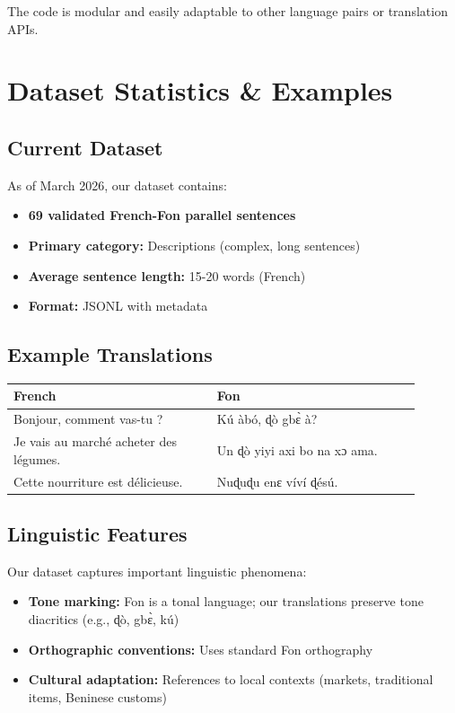 \documentclass[10pt,twocolumn]{article}
\begin{document}
The code is modular and easily adaptable to other language pairs or translation APIs.

\section{Dataset Statistics \& Examples}

\subsection{Current Dataset}

As of March 2026, our dataset contains:
\begin{itemize}[leftmargin=*,noitemsep,topsep=0pt]
    \item \textbf{69 validated French-Fon parallel sentences}
    \item \textbf{Primary category:} Descriptions (complex, long sentences)
    \item \textbf{Average sentence length:} 15-20 words (French)
    \item \textbf{Format:} JSONL with metadata
\end{itemize}

\subsection{Example Translations}

\begin{small}
\begin{tabular}{p{0.45\linewidth}p{0.45\linewidth}}
\toprule
\textbf{French} & \textbf{Fon} \\
\midrule
Bonjour, comment vas-tu ? & Kú àbó, ɖò gbɛ̀ à? \\
\midrule
Je vais au marché acheter des légumes. & Un ɖò yiyi axi bo na xɔ ama. \\
\midrule
Cette nourriture est délicieuse. & Nuɖuɖu enɛ víví ɖésú. \\
\bottomrule
\end{tabular}
\end{small}

\subsection{Linguistic Features}

Our dataset captures important linguistic phenomena:
\begin{itemize}[leftmargin=*,noitemsep,topsep=0pt]
    \item \textbf{Tone marking:} Fon is a tonal language; our translations preserve tone diacritics (e.g., ɖò, gbɛ̀, kú)
    \item \textbf{Orthographic conventions:} Uses standard Fon orthography
    \item \textbf{Cultural adaptation:} References to local contexts (markets, traditional items, Beninese customs)
\end{itemize}
\end{document}
